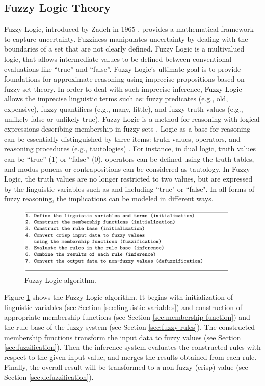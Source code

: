 \documentclass[11pt]{article}
\begin{document}
\subsection{Fuzzy Logic Theory}
\label{sec:flt}

Fuzzy Logic, introduced by Zadeh in 1965 \cite{zadeh:fuzzy}, provides a
mathematical framework to capture uncertainty. Fuzziness manipulates uncertainty
by dealing with the boundaries of a set that are not clearly defined. Fuzzy
Logic is a multivalued logic, that allows intermediate values to be defined
between conventional evaluations like ``true'' and ``false''. Fuzzy Logic's
ultimate goal is to provide foundations for approximate reasoning using
imprecise propositions based on fuzzy set theory. In order to deal with such
imprecise inference, Fuzzy Logic allows the imprecise linguistic terms such as:
fuzzy predicates (e.g., old, expensive), fuzzy quantifiers (e.g., many, little),
and fuzzy truth values (e.g., unlikely false or unlikely true). Fuzzy Logic is a
method for reasoning with logical expressions describing membership in fuzzy
sets \cite{russell:ai-modern}. Logic as a base for reasoning can be essentially
distinguished by three items: truth values, operators, and reasoning procedures
(e.g., tautologies) \cite{zimmermann:fuzzy-sets}. For instance, in dual logic,
truth values can be ``true'' (1) or ``false'' (0), operators can be defined
using the truth tables, and modus ponens or contrapositions can be considered as
tautology. In Fuzzy Logic, the truth values are no longer restricted to two
values, but are expressed by the linguistic variables such as and including
``true" or ``false". In all forms of fuzzy reasoning, the implications can be
modeled in different ways.

\begin{figure}[tbh]
  \center
  \includegraphics[width=0.95\textwidth]{figure/fuzzy-algorithm.png}
  \caption{Fuzzy Logic algorithm.}
  \label{fig:fuzzy-algorithm}
\end{figure}

Figure \ref{fig:fuzzy-algorithm} shows the Fuzzy Logic algorithm. It begins
with initialization of linguistic variables (see Section
\ref{sec:linguistic-variables}) and construction of appropriate membership
functions (see Section \ref{sec:membership-function}) and the rule-base of the
fuzzy system (see Section \ref{sec:fuzzy-rules}). The constructed membership
functions transform the input data to fuzzy values (see Section
\ref{sec:fuzzification}). Then the inference system evaluates the constructed
rules with respect to the given input value, and merges the results obtained
from each rule. Finally, the overall result will be transformed to a non-fuzzy
(crisp) value (see Section \ref{sec:defuzzification}).
\end{document}
